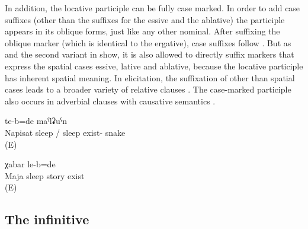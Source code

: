In addition, the locative participle can be fully case marked. In order to add case suffixes (other than the suffixes for the essive and the ablative) the participle appears in its oblique forms, just like any other nominal. After suffixing the oblique marker  (which is identical to the ergative), case suffixes follow . But as  and the second variant in  show, it is also allowed to directly suffix markers that express the spatial cases essive, lative and ablative, because the locative participle has inherent spatial meaning. In elicitation, the suffixation of other than spatial cases leads to a broader variety of relative clauses . The case-marked participle also occurs in adverbial clauses with causative semantics .
%
\begin{exe}
	\ex	\label{ex:‎‎‎Where Napisat was sleeping there was a snake}
		te-b=de	maˁlʡuˁn\\
		Napisat	sleep	/ sleep	exist-	snake\\
	\glt	{} (E)

	\ex	\label{ex:‎ ‎‎There was the gossip that Maja was lying}
		χabar	le-b=de\\
		Maja	sleep	story	exist\\
	\glt	{} (E)
\end{exe}



\subsection{The infinitive}
\label{ssec:The infinitive}

